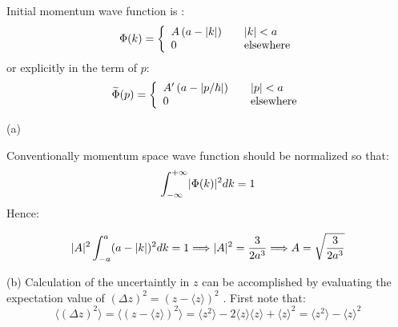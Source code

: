 \begin{homeworkProblem}
Initial momentum wave function is :
\begin{equation}
\Phi(k) = \left\{ 
  \begin{array}{l l}
     A\left(a-\lvert k\rvert\right) & \quad \text{$\lvert k\rvert<a$ }\\
     0 & \quad \text{elsewhere}
   \end{array} \right.\end{equation}
or explicitly in the term of $p$:
\begin{equation}
\widetilde{\Phi}(p)=
\left\{ 
  \begin{array}{l l}
     A'\left(a-\lvert p/\hbar\rvert\right) & \quad \text{$\lvert p\rvert<a$ }\\
     0 & \quad \text{elsewhere}
   \end{array} \right.
\end{equation}

\begin{homeworkSection}{(a)} 

Conventionally  momentum space wave function should be normalized so that:
\begin{equation}
\int_{-\infty}^{+\infty}\lvert\Phi(k)\rvert^2dk=1
\end{equation}
Hence: 

\begin{equation}
\lvert A\rvert^2\int_{-a}^{a}(a-\lvert k\rvert)^2dk=1\Longrightarrow \lvert A\rvert^2=\frac{3}{2a^3}\Longrightarrow A=\sqrt{\frac{3}{2a^3}}
\end{equation}

\end{homeworkSection}
\begin{homeworkSection}{(b)}
 Calculation of the uncertaintly in $z$  can be accomplished by evaluating the expectation value of $(\Delta z)^2=(z-\langle z\rangle)^2$ . First note that:
\begin{equation}
\langle \left(\Delta z\right )^2\rangle= \langle\left(z-\langle z\rangle\right)^2\rangle=\langle z^2\rangle-2\langle z\rangle\langle z\rangle+\langle z\rangle^2=\langle z^2\rangle-\langle z\rangle^2
\end{equation}


\end{homeworkSection}
\end{homeworkProblem}
